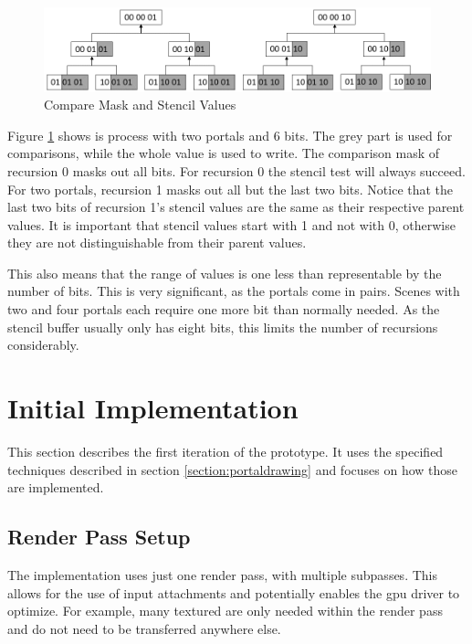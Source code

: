 \begin{figure}[h]
	\includegraphics[width=\linewidth]{images/stencilvalues2.png}
	\caption{Compare Mask and Stencil Values}
	\label{fig:stencilvalues}
\end{figure}

Figure \ref{fig:stencilvalues} shows is process with two portals and 6 bits. The grey part is used for comparisons, while the whole value is used to write. The comparison mask of recursion 0 masks out all bits. For recursion 0 the stencil test will always succeed. For two portals, recursion 1 masks out all but the last two bits. Notice that the last two bits of recursion 1's stencil values are the same as their respective parent values. It is important that stencil values start with 1 and not with 0, otherwise they are not distinguishable from their parent values.

This also means that the range of values is one less than representable by the number of bits. This is very significant, as the portals come in pairs. Scenes with two and four portals each require one more bit than normally needed. As the stencil buffer usually only has eight bits, this limits the number of recursions considerably.



\section{Initial Implementation}
\label{section:intialimplementation}
This section describes the first iteration of the prototype. It uses the specified techniques described in section \ref{section:portaldrawing} and focuses on how those are implemented.


\subsection{Render Pass Setup}
\label{section:renderpasssetup}

The implementation uses just one render pass, with multiple subpasses. This allows for the use of input attachments and potentially enables the \gls{gpu} driver to optimize. For example, many textured are only needed within the render pass and do not need to be transferred anywhere else.

